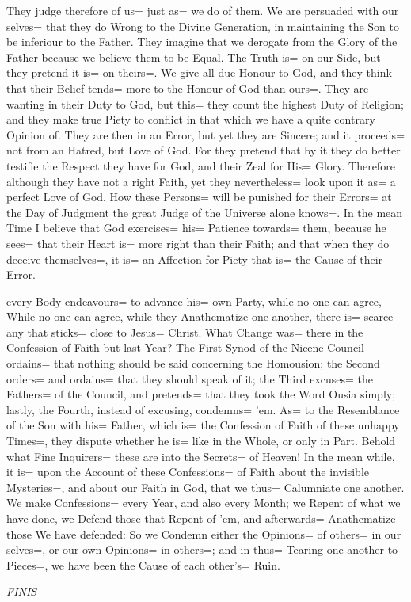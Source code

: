 \clearpage
\newpage
{}
They judge therefore of us= just as= we do of them.
We are persuaded with our selves= that they do Wrong to the Divine Generation,
in maintaining the Son to be inferiour to the Father.
They imagine that we derogate from the Glory of the Father because we believe them to be Equal.
The Truth is= on our Side,
but they pretend it is= on theirs=.
We give all due Honour to God,
and they think that their Belief tends= more to the Honour of God than ours=.
They are wanting in their Duty to God,
but this= they count the highest Duty of Religion;
and they make true Piety to conflict in that which we have a quite contrary Opinion of.
They are then in an Error,
but yet they are Sincere;
and it proceeds= not from an Hatred, but Love of God.
For they pretend that by it they do better testifie the Respect they have for God,
and their Zeal for His= Glory.
Therefore although they have not a right Faith,
yet they nevertheless= look upon it as= a perfect Love of God.
How these Persons= will be punished for their Errors= at the Day of Judgment the great Judge of the Universe alone knows=.
In the mean Time I believe that God exercises= his= Patience towards= them,
because he sees= that their Heart is= more right than their Faith;
and that when they do deceive themselves=,
it is= an Affection for Piety that is= the Cause of their Error.
\fancyfoot{}

\clearpage
\newpage
{}\label{place:CO2}
\marginpar{\raisebox{0pt}{\color{red}\pageref{place:CO1}}}
every Body endeavours= to advance his= own Party,
while no one can agree,
While no one can agree, while they Anathematize one another,
there is= scarce any that sticks= close to Jesus= Christ.
What Change was= there in the Confession of Faith but last Year?
The First Synod of the Nicene Council ordains= that nothing should be said concerning the Homousion;
the Second orders= and ordains= that they should speak of it;
the Third excuses= the Fathers= of the Council,
and pretends= that they took the Word Ousia simply;
lastly, the Fourth, instead of excusing, condemns= 'em.
As= to the Resemblance of the Son with his= Father,
which is= the Confession of Faith of these unhappy Times=,
they dispute whether he is= like in the Whole, or only in Part.
Behold what Fine Inquirers= these are into the Secrets= of Heaven!
In the mean while,
it is= upon the Account of these Confessions= of Faith about the invisible Mysteries=,
and about our Faith in God,
that we thus= Calumniate one another.
We make Confessions= every Year, and also every Month;
we Repent of what we have done, we Defend those that Repent of 'em,
and afterwards= Anathematize those We have defended:
So we Condemn either the Opinions= of others= in our selves=,
or our own Opinions= in others=;
and in thus= Tearing one another to Pieces=,
we have been the Cause of each other's= Ruin.

\begin{center}
{\large \itshape FINIS}
\end{center}
